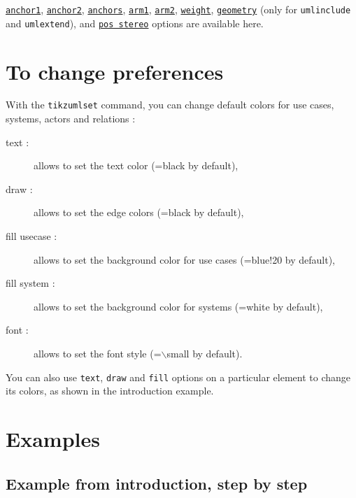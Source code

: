 \documentclass[a4paper,11pt]{report}
\newcommand{\inputTikZ}[1]{%
  }%
\newcommand{\inputTikZ}[1]{%
    \texttt{[image: fig/\#1.pdf]}%
  }%
\begin{document}
\hyperlink{anchor1}{{\tt anchor1}}, \hyperlink{anchor2}{{\tt anchor2}}, \hyperlink{anchors}{{\tt anchors}}, \hyperlink{arm1}{{\tt arm1}}, \hyperlink{arm2}{{\tt arm2}}, \hyperlink{weight}{{\tt weight}}, \hyperlink{geometry}{{\tt geometry}} (only for {\tt umlinclude} and {\tt umlextend}), and \hyperlink{posstereo}{{\tt pos stereo}} options are available here.

\medskip

\begin{minipage}{0.51\textwidth}

\end{minipage}
\begin{minipage}{0.49\textwidth}
\begin{center}
\inputTikZ{include-and-extend}
\end{center}
\end{minipage}

\medskip

\section{To change preferences}\label{s.fitusecase}

With the {\tt tikzumlset} command, you can change default colors for use cases, systems, actors and relations :

\begin{description}
\item[text :] allows to set the text color (=black by default),
\item[draw :] allows to set the edge colors (=black by default),
\item[fill usecase :] allows to set the background color for use cases (=blue!20 by default),
\item[fill system :] allows to set the background color for systems (=white by default),
\item[font :] allows to set the font style (=$\backslash$small by default).
\end{description}

You can also use {\tt text}, {\tt draw} and {\tt fill} options on a particular element to change its colors, as shown in the introduction example.

\section{Examples}

\subsection{Example from introduction, step by step}
\end{document}
